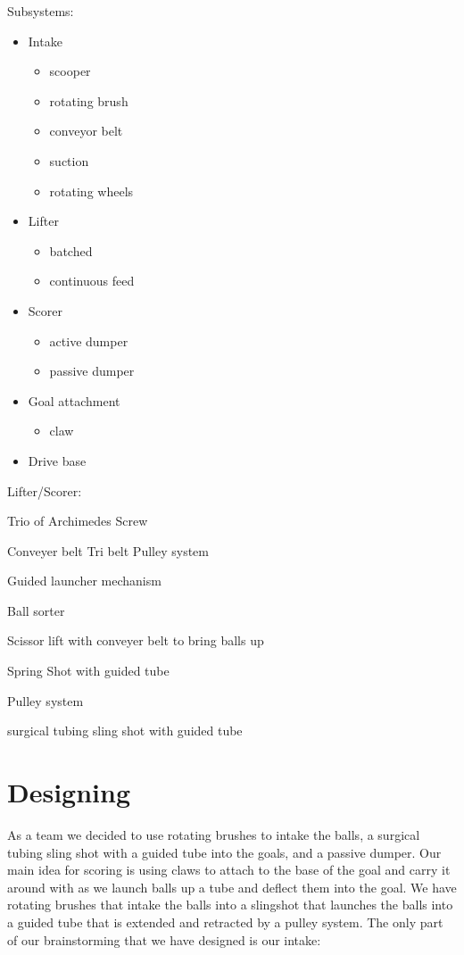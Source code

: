 Subsystems:
\begin{itemize}
 \item Intake
 \begin{itemize}
  \item scooper
  \item rotating brush
  \item conveyor belt
  \item suction
  \item rotating wheels
 \end{itemize}
 \item Lifter
 \begin{itemize}
  \item batched
  \item continuous feed
 \end{itemize}
 \item Scorer
 \begin{itemize}
  \item active dumper
  \item passive dumper
 \end{itemize}
 \item Goal attachment
 \begin{itemize}
  \item claw
 \end{itemize}
 \item Drive base
\end{itemize}

Lifter/Scorer:

Trio of Archimedes Screw

Conveyer belt Tri belt Pulley system

Guided launcher mechanism

Ball sorter

Scissor lift with conveyer belt to bring balls up

Spring Shot with guided tube

Pulley system

surgical tubing sling shot with guided tube

\section*{Designing}
As a team we decided to use rotating brushes to intake the balls,
a surgical tubing sling shot with a guided tube into the goals,
and a passive dumper. Our main idea for scoring is using claws to attach
to the base of the goal and carry it around with as we launch balls up a tube and
deflect them into the goal. We have rotating brushes that intake the balls into a
slingshot that launches the balls into a guided tube that is extended and retracted by
a pulley system. The only part of our brainstorming that we have designed is our intake:


